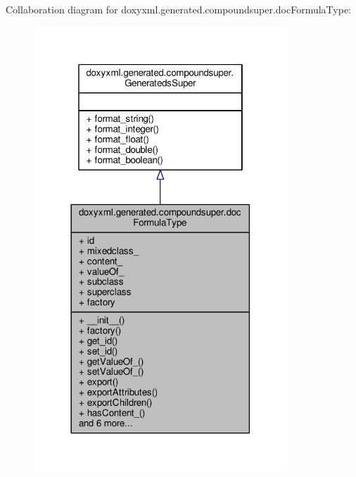 Collaboration diagram for doxyxml.\+generated.\+compoundsuper.\+doc\+Formula\+Type\+:
\nopagebreak
\begin{figure}[H]
\begin{center}
\leavevmode
\includegraphics[width=270pt]{d5/d4e/classdoxyxml_1_1generated_1_1compoundsuper_1_1docFormulaType__coll__graph}
\end{center}
\end{figure}
